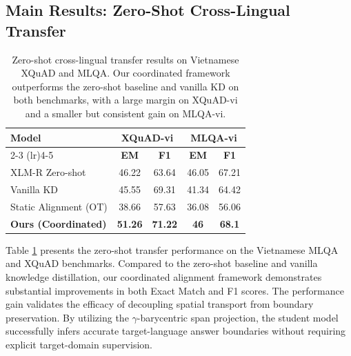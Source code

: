 \documentclass[11pt]{article}
\begin{document}
\subsection{Main Results: Zero-Shot Cross-Lingual Transfer}

\begin{table}[H]
\centering
\small
\setlength{\tabcolsep}{4pt}
\begin{tabular}{lcccc}
\toprule
\multirow{2}{*}{\textbf{Model}} & \multicolumn{2}{c}{\textbf{XQuAD-vi}} & \multicolumn{2}{c}{\textbf{MLQA-vi}} \\
\cmidrule(lr){2-3} \cmidrule(lr){4-5}
 & \textbf{EM} & \textbf{F1} & \textbf{EM} & \textbf{F1} \\
\midrule
XLM-R Zero-shot & 46.22 & 63.64 & 46.05 & 67.21 \\
Vanilla KD & 45.55 & 69.31 & 41.34 & 64.42 \\
Static Alignment (OT) & 38.66 & 57.63 & 36.08 & 56.06 \\
\midrule
\textbf{Ours (Coordinated)} & \textbf{51.26} & \textbf{71.22} & \textbf{46} & \textbf{68.1} \\
\bottomrule
\end{tabular}
\caption{Zero-shot cross-lingual transfer results on Vietnamese XQuAD and MLQA. Our coordinated framework outperforms the zero-shot baseline and vanilla KD on both benchmarks, with a large margin on XQuAD-vi and a smaller but consistent gain on MLQA-vi.}
\label{tab:main_results}
\end{table}

Table \ref{tab:main_results} presents the zero-shot transfer performance on the Vietnamese MLQA and XQuAD benchmarks. Compared to the zero-shot baseline and vanilla knowledge distillation, our coordinated alignment framework demonstrates substantial improvements in both Exact Match and F1 scores. The performance gain validates the efficacy of decoupling spatial transport from boundary preservation. By utilizing the $\gamma$-barycentric span projection, the student model successfully infers accurate target-language answer boundaries without requiring explicit target-domain supervision.
\end{document}
